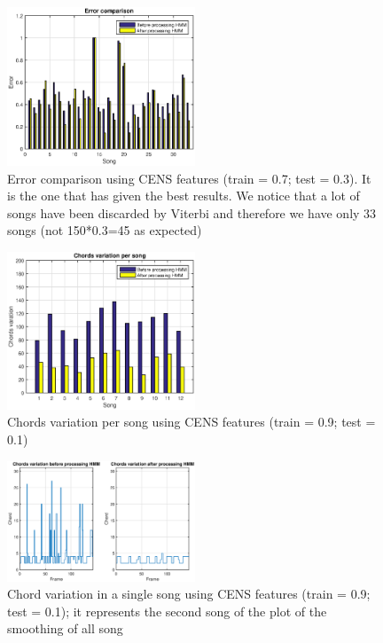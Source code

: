 \begin{figure} [h!]
	\includegraphics[width=0.5\textwidth]{img/Result_HMM/CENS/plot03071}
	\caption{Error comparison using CENS features (train = 0.7; test = 0.3). It is the one that has given the best results. We notice that a lot of songs have been discarded by Viterbi and therefore we have only 33 songs (not 150*0.3=45 as expected)}
\end{figure}

\begin{figure} [h!]
	\includegraphics[width=0.5\textwidth]{img/Result_HMM/SMOOTHING/SmoothPerSongCENS0109}
	\caption{Chords variation per song using CENS features (train = 0.9; test = 0.1)}
\end{figure}

\begin{figure} [h!]
	\includegraphics[width=0.5\textwidth]{img/Result_HMM/SMOOTHING/SmoothSingleSongCENS0109}
	\caption{Chord variation in a single song using CENS features (train = 0.9; test = 0.1); it represents the second song of the plot of the smoothing of all song}
\end{figure}
